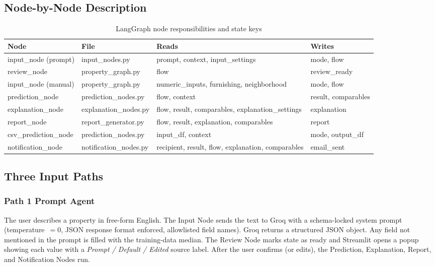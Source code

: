 \documentclass[12pt,a4paper]{article}
\begin{document}
\subsection{Node-by-Node Description}

\begin{table}[H]
\centering
\caption{LangGraph node responsibilities and state keys}
\renewcommand{\arraystretch}{1.3}
\begin{tabularx}{\textwidth}{p{3cm}p{3.5cm}p{2.8cm}X}
\toprule
\textbf{Node} & \textbf{File} & \textbf{Reads} & \textbf{Writes} \\
\midrule
input\_node (prompt)  & input\_nodes.py      & prompt, context, input\_settings & mode, flow \\
review\_node          & property\_graph.py   & flow & review\_ready \\
input\_node (manual)  & property\_graph.py   & numeric\_inputs, furnishing, neighborhood & mode, flow \\
prediction\_node      & prediction\_nodes.py & flow, context & result, comparables \\
explanation\_node     & explanation\_nodes.py & flow, result, comparables, explanation\_settings & explanation \\
report\_node          & report\_generator.py & flow, result, explanation, comparables & report \\
csv\_prediction\_node & prediction\_nodes.py & input\_df, context & mode, output\_df \\
notification\_node    & notification\_nodes.py & recipient, result, flow, explanation, comparables & email\_sent \\
\bottomrule
\end{tabularx}
\end{table}

\subsection{Three Input Paths}

\subsubsection{Path 1 \textemdash{} Prompt Agent}

The user describes a property in free-form English. The Input Node sends the text to Groq with a schema-locked system prompt (temperature~$= 0$, JSON response format enforced, allowlisted field names). Groq returns a structured JSON object. Any field not mentioned in the prompt is filled with the training-data median. The Review Node marks state as ready and Streamlit opens a popup showing each value with a \textit{Prompt / Default / Edited} source label. After the user confirms (or edits), the Prediction, Explanation, Report, and Notification Nodes run.
\end{document}
